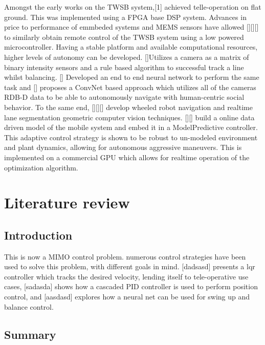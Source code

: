     Amongst the early works on the TWSB system,[1] achieved telle-operation on flat ground. 
    This was implemented using a FPGA base DSP system. Advances in price to performance of emmbeded systems and MEMS sensors have allowed 
    [][][] to similarly obtain remote control of the TWSB system using a low powered microcontroller.
    Having a stable platform and available computational resources, higher levels of autonomy can be developed. 
    []Utilizes a camera as a matrix of binary intensity sensors and a rule based algorithm to successful track 
    a line whilst balancing. [] Developed an end to end neural network to perform the same task and [] proposes 
    a ConvNet based approach which utilizes all of the cameras RDB-D data to be able to 
    autonomously navigate with human-centric social behavior. 
    To the same end, [][][] develop wheeled robot navigation and realtime lane segmentation geometric computer vision techniques. 
    [][] build a online data driven model of the mobile system and embed it in a ModelPredictive controller. This adaptive control strategy 
    is shown to be robust to un-modeled environment and plant dynamics, allowing for autonomous aggressive maneuvers. 
    This is implemented on a commercial GPU which allows for realtime operation of the optimization algorithm.




  \section{Literature review} %

    \subsection{Introduction}

    This is now a MIMO control problem. numerous control strategies have been used to solve this problem, 
    with different goals in mind. [dadsasd] presents a lqr controller which tracks 
    the desired velocity, lending itself to tele-operative use cases, [sadasda] 
    shows how a cascaded PID controller is used to perform position control, 
    and [aasdasd] explores how a neural net can be used for swing up and balance control.
    \subsection{Summary}
  \pagebreak{}
